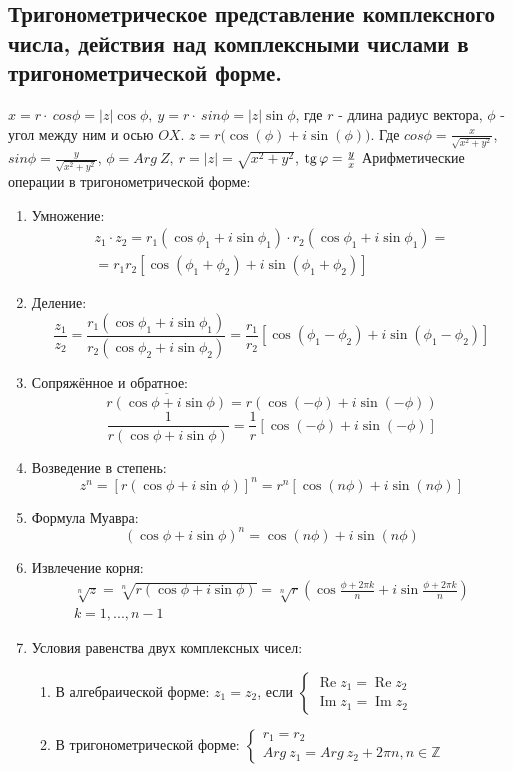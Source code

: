 \documentclass[a4paper,14pt]{article}
\DeclareMathOperator{\realpart}{\mathop{Re}}	%
\DeclareMathOperator{\imgpart}{\mathop{Im}} 	%
\begin{document}
\subsection{Тригонометрическое представление комплексного числа, действия над комплексными числами в тригонометрической форме.}
\noindent $x=r\cdot\ cos\phi=\left|z\right|\cos{\phi},\ y=r\cdot\ sin\phi=\left|z\right|\sin{\phi}$, где $r$ - длина радиус вектора, $\phi$ - угол между ним и осью $OX$.
\noindent $z=r(\cos{\left(\phi\right)+i\sin{(\phi))}}$. Где $cos\phi=\frac{x}{\sqrt{x^2+y^2}}$, $sin\phi=\frac{y}{\sqrt{x^2+y^2}}$, $\phi=Arg\ Z,\ r=\left|z\right|=\sqrt{x^2+y^2}$, $\mathop{\mathrm{tg}}\nolimits \varphi=\frac{y}{x}$
\vspace{\baselineskip}
Арифметические операции в тригонометрической форме:
\begin{enumerate}
	\item Умножение:
	\begin{multline}
		z_1 \cdot z_2 = r_1(\cos \phi_1 + i \sin \phi_1) \cdot r_2 (\cos \phi_1 + i \sin \phi_1)= \\ =r_1r_2\left[\cos (\phi_1+\phi_2)+i \sin(\phi_1+\phi_2)\right]
	\end{multline}
	\item Деление:
	\[\frac{z_1}{z_2}= \frac{r_1(\cos \phi_1+i \sin \phi_1)}{r_2(\cos \phi_2+i \sin \phi_2)}=\frac{r_1}{r_2}\left[\cos(\phi_1 - \phi_2)+i \sin (\phi_1 - \phi_2)\right]\]
	\item Сопряжённое и обратное:
	\[\overline{r(\cos \phi + i \sin \phi)}=r(\cos(-\phi)+i \sin (-\phi))\]
	\[\frac{1}{r(\cos \phi + i \sin \phi)}=\frac{1}{r}\left[\cos(-\phi)+i \sin (-\phi)\right]\]
	\item Возведение в степень:
	\[z^n=\left[r(\cos \phi + i \sin \phi)\right]^n=r^n\left[\cos (n\phi)+i \sin (n \phi)\right]\]
	\item Формула Муавра:
	\[(\cos \phi + i \sin \phi)^n=\cos (n \phi)+i \sin(n \phi)\]
	\item Извлечение корня:
	\begin{multline}
	\sqrt[n]{z}=\sqrt[n]{r(\cos \phi + i \sin \phi)}=\sqrt[n]{r}\left(\cos \frac{\phi + 2 \pi k}{n}+i \sin \frac{\phi + 2 \pi k}{n}\right) \\ k=1,...,n-1
	\end{multline}
	\item Условия равенства двух комплексных чисел:
	\begin{enumerate}
		\item В алгебраической форме: $z_1=z_2$, если $\begin{cases}\realpart z_1 = \realpart z_2 \\ \imgpart z_1 = \imgpart z_2\end{cases}$
		\item В тригонометрической форме: $\begin{cases}r_1=r_2 \\ Arg \ z_1 = Arg \ z_2 + 2 \pi n, n \in \mathbb{Z}\end{cases}$
	\end{enumerate}
\end{enumerate}
\end{document}
